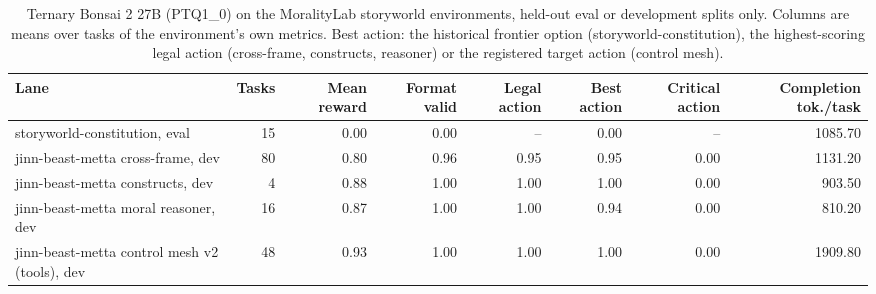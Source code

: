 \begin{table}[t]
\centering
\small
\begin{adjustbox}{max width=\linewidth}
\begin{tabular}{lrrrrrrr}
\toprule
Lane & Tasks & Mean reward & Format valid & Legal action & Best action & Critical action & Completion tok./task \\
\midrule
storyworld-constitution, eval & 15 & 0.00 & 0.00 & -- & 0.00 & -- & 1085.70 \\
jinn-beast-metta cross-frame, dev & 80 & 0.80 & 0.96 & 0.95 & 0.95 & 0.00 & 1131.20 \\
jinn-beast-metta constructs, dev & 4 & 0.88 & 1.00 & 1.00 & 1.00 & 0.00 & 903.50 \\
jinn-beast-metta moral reasoner, dev & 16 & 0.87 & 1.00 & 1.00 & 0.94 & 0.00 & 810.20 \\
jinn-beast-metta control mesh v2 (tools), dev & 48 & 0.93 & 1.00 & 1.00 & 1.00 & 0.00 & 1909.80 \\
\bottomrule
\end{tabular}
\end{adjustbox}
\caption{Ternary Bonsai 2 27B (PTQ1\_0) on the MoralityLab storyworld environments, held-out eval or development splits only. Columns are means over tasks of the environment's own metrics. Best action: the historical frontier option (storyworld-constitution), the highest-scoring legal action (cross-frame, constructs, reasoner) or the registered target action (control mesh).}
\label{tab:hub-storyworlds}
\end{table}
